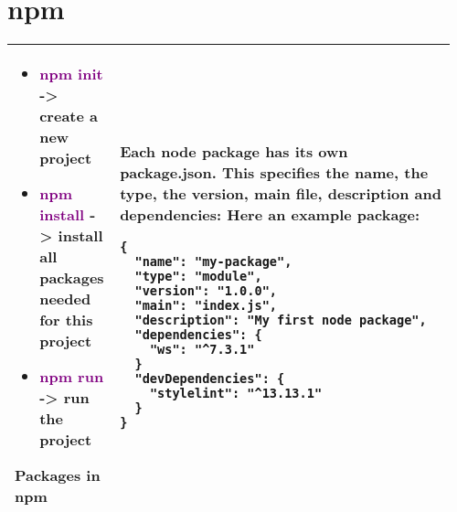 \documentclass[main.tex,fontsize=8pt,paper=a4,paper=portrait,DIV=calc,]{scrartcl}
\begin{document}
\begin{table}[ht!]
\section{npm}
\begin{tabular}{|m{0.2\linewidth}|m{0.755\linewidth}|}
\hline
\begin{itemize}
\item \textcolor{purple}{npm init} -> create a new project
\item \textcolor{purple}{npm install} -> install all packages needed for this project
\item \textcolor{purple}{npm run} -> run the project
\vspace{-3mm}
\end{itemize} 
\hline
Packages in npm & 
Each node package has its own \textbf{package.json}.\newline
This specifies \textbf{the name, the type, the version, main file, description and dependencies}:\newline
Here an example package:\newline
\begin{lstlisting}
{
  "name": "my-package",
  "type": "module",
  "version": "1.0.0",
  "main": "index.js",
  "description": "My first node package",
  "dependencies": {
    "ws": "^7.3.1"
  }
  "devDependencies": {
    "stylelint": "^13.13.1"
  }
}
\end{lstlisting}\\
\hline

\hline

\hline

\hline

\hline
\end{tabular}
\end{table}
\end{document}
